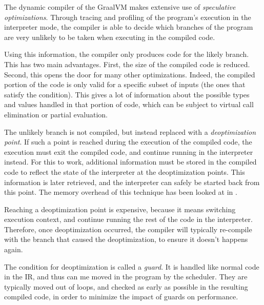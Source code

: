 \documentclass[twoside,11pt,a4paper]{article}
\begin{document}
The dynamic compiler of the GraalVM makes extensive use of \textit{speculative optimizations}. Through tracing and profiling of the program's execution in the interpreter mode, the compiler is able to decide which branches of the program are very unlikely to be taken when executing in the compiled code.

Using this information, the compiler only produces code for the likely branch. This has two main advantages. First, the size of the compiled code is reduced. Second, this opens the door for many other optimizations. Indeed, the compiled portion of the code is only valid for a specific subset of inputs (the ones that satisfy the condition). This gives a lot of information about the possible types and values handled in that portion of code, which can be subject to virtual call elimination or partial evaluation.

The unlikely branch is not compiled, but instead replaced with a \textit{deoptimization point}. If such a point is reached during the execution of the compiled code, the execution must exit the compiled code, and continue running in the interpreter instead. For this to work, additional information must be stored in the compiled code to reflect the state of the interpreter at the deoptimization points. This information is later retrieved, and the interpreter can safely be started back from this point. The memory overhead of this technique has been looked at in \cite{graaldatacompression}.

Reaching a deoptimization point is expensive, because it means switching execution context, and continue running the rest of the code in the interpreter. Therefore, once deoptimization occurred, the compiler will typically re-compile with the branch that caused the deoptimization, to ensure it doesn't happens again.

The condition for deoptimization is called a \textit{guard}. It is handled like normal code in the IR, and thus can me moved in the program by the scheduler. They are typically moved out of loops, and checked as early as possible in the resulting compiled code, in order to minimize the impact of guards on performance.

\end{document}
